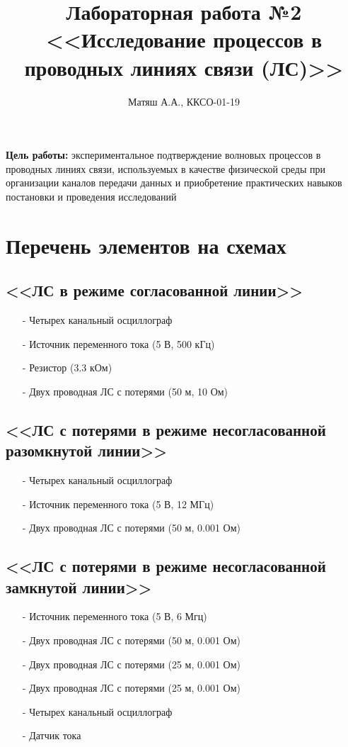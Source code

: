 \documentclass[11pt]{article}
\title{\textbf{Лабораторная работа №2\\<<Исследование процессов в проводных линиях связи (ЛС)>>}}
\author{Матяш А.А., ККСО-01-19}
\date{}
\begin{document}
\maketitle
\thispagestyle{empty}
\textbf{Цель работы:} экспериментальное подтверждение волновых процессов в проводных линиях связи, используемых в качестве физической среды при организации каналов передачи данных и приобретение практических навыков постановки и проведения исследований 
\section{Перечень элементов на схемах}
\subsection{<<ЛС в режиме согласованной линии>>}
\begin{itemize}
    \item[-] Четырех канальный осциллограф
    \item[-] Источник переменного тока (5 В, 500 кГц)
    \item[-] Резистор (3.3 кОм)
    \item[-] Двух проводная ЛС с потерями (50 м, 10 Ом)
\end{itemize}
\subsection{<<ЛС с потерями в режиме несогласованной разомкнутой линии>>}
\begin{itemize}
    \item[-] Четырех канальный осциллограф
    \item[-] Источник переменного тока (5 В, 12 МГц)
    \item[-] Двух проводная ЛС с потерями (50 м, 0.001 Ом)
\end{itemize}
\subsection{<<ЛС с потерями в режиме несогласованной замкнутой линии>>}
\begin{itemize}
    \item[-] Источник переменного тока (5 В, 6 Мгц)
    \item[-] Двух проводная ЛС с потерями (50 м, 0.001 Ом)
    \item[-] Двух проводная ЛС с потерями (25 м, 0.001 Ом)
    \item[-] Двух проводная ЛС с потерями (25 м, 0.001 Ом)
    \item[-] Четырех канальный осциллограф
    \item[-] Датчик тока
\end{itemize}
\end{document}
